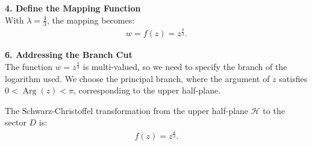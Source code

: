 \begin{example}
    \textbf{4. Define the Mapping Function} \\

    With $\lambda = \frac{4}{3}$, the mapping becomes:
    \begin{align*}
        w = f(z) = z^{\frac{4}{3}}.
    \end{align*}

    \textbf{6. Addressing the Branch Cut} \\

    The function $w = z^{\frac{4}{3}}$ is multi-valued, so we need to specify the branch of the logarithm used. We choose the principal branch, where the argument of $z$ satisfies $0 < \operatorname{Arg}(z) < \pi$, corresponding to the upper half-plane.

    The Schwarz-Christoffel transformation from the upper half-plane $\mathcal{H}$ to the sector $D$ is:
    \begin{align*}
        f(z) = z^{\frac{4}{3}}.
    \end{align*}

\end{example}

